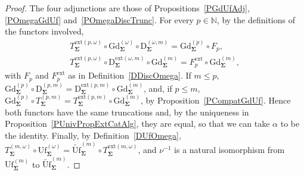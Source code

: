 \documentclass{amsart}
\theoremstyle{plain}
\theoremstyle{definition}
\begin{document}
\begin{proof}
The four adjunctions are those of Propositions~\ref{PGdUfAdj}, \ref{POmegaGdUf} and~\ref{POmegaDiscTrunc}. For every $p\in\mathbb{N}$, by the definitions of the functors involved,
\begin{gather*}
T^{\mathrm{ext}(p,\omega)}_{\mathbf{\Sigma}}\circ\mathrm{Gd}^{(\omega)}_{\mathbf{\Sigma}}\circ\mathrm{D}^{(\omega,m)}_{\mathbf{\Sigma}}=\mathrm{Gd}^{(p)}_{\mathbf{\Sigma}}\circ F_{p},\\
T^{\mathrm{ext}(p,\omega)}_{\mathbf{\Sigma}}\circ\mathrm{D}^{\mathrm{ext}(\omega,m)}_{\mathbf{\Sigma}}\circ\mathrm{Gd}^{(m)}_{\mathbf{\Sigma}}=F^{\mathrm{ext}}_{p}\circ\mathrm{Gd}^{(m)}_{\mathbf{\Sigma}},
\end{gather*}
with $F_{p}$ and $F^{\mathrm{ext}}_{p}$ as in Definition~\ref{DDiscOmega}. If $m\leq p$, $\mathrm{Gd}^{(p)}_{\mathbf{\Sigma}}\circ\mathrm{D}^{(p,m)}_{\mathbf{\Sigma}}=\mathrm{D}^{\mathrm{ext}(p,m)}_{\mathbf{\Sigma}}\circ\mathrm{Gd}^{(m)}_{\mathbf{\Sigma}}$, and, if $p\leq m$, $\mathrm{Gd}^{(p)}_{\mathbf{\Sigma}}\circ T^{(p,m)}_{\mathbf{\Sigma}}=T^{\mathrm{ext}(p,m)}_{\mathbf{\Sigma}}\circ\mathrm{Gd}^{(m)}_{\mathbf{\Sigma}}$, by Proposition~\ref{PCompatGdUf}. Hence both functors have the same truncations and, by the uniqueness in Proposition~\ref{PUnivPropExtCatAlg}, they are equal, so that we can take $\alpha$ to be the identity. Finally, by Definition~\ref{DUfOmega}, $T^{(m,\omega)}_{\mathbf{\Sigma}}\circ\mathrm{Uf}^{(\omega)}_{\mathbf{\Sigma}}=\widetilde{\mathrm{Uf}}^{(m)}_{\mathbf{\Sigma}}\circ T^{\mathrm{ext}(m,\omega)}_{\mathbf{\Sigma}}$, and $\nu^{-1}$ is a natural isomorphism from $\mathrm{Uf}^{(m)}_{\mathbf{\Sigma}}$ to $\widetilde{\mathrm{Uf}}^{(m)}_{\mathbf{\Sigma}}$.
\end{proof}
\end{document}
